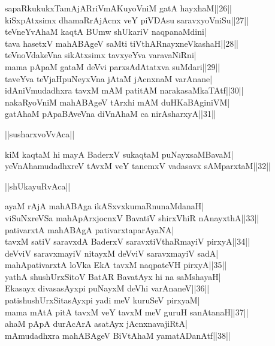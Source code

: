 \documentclass{article}
\begin{document}
sapaRkukukxTamAjARriVmAKuyoVniM gatA hayxhaM||26||\\
kiSxpAtxsimx dhamaRrAjAcnx veY piVDAsu saravxyoVniSu||27||\\
teVneYvAhaM kaqtA BUmw shUkariV naqpanaMdini|\\
tava hasetxV mahABAgeV saMti tiVthARnayxneVkashaH||28||\\
teVnoVdakeVna sikAtxsimx tavxyeYva varavaNiRni|\\
mama pApaM gataM deVvi parxsAdAtatxva suMdari||29||\\
taveYva teVjaHpuNeyxVna jAtaM jAcnxnaM varAnane|\\
idAniVmudadhxra tavxM mAM patitAM narakasaMkaTAtf||30||\\
nakaRyoVniM mahABAgeV tArxhi mAM duHKaBAginiVM|\\
gatAhaM pApaBAveVna diVnAhaM ca nirAsharxyA||31||\\

\begin{center}
||susharxvoVvAca||
\end{center}

kiM kaqtaM hi mayA BaderxV sukaqtaM puNayxsaMBavaM|\\
yeVnAhamudadhxreV tAvxM veY tanemxV vadasavx sAMparxtaM||32||\\

\begin{center}
||shUkayuRvAca||
\end{center}

ayaM rAjA mahABAga ikASxvxkumaRnunaMdanaH|\\
viSuNxreVSa mahApArxjocnxV BavatiV shirxVhiR nAnayxthA||33||\\
pativarxtA mahABAgA pativarxtaparAyaNA|\\
tavxM satiV saravxdA BaderxV saravxtiVthaRmayiV pirxyA||34||\\
deVviV saravxmayiV nitayxM deVviV saravxmayiV sadA|\\
mahApativarxtA loVka EkA tavxM naqpateVH pirxyA||35||\\
yathA shushUrxSitoV BatAR BavatAyx hi na saMshayaH|\\
Ekasayx divasasAyxpi puNayxM deVhi varAnaneV||36||\\
patishushUrxSitasAyxpi yadi meV kuruSeV pirxyaM|\\
mama mAtA pitA tavxM veY tavxM meV guruH sanAtanaH||37||\\
ahaM pApA durAcArA asatAyx jAcnxnavajiRtA|\\
mAmudadhxra mahABAgeV BiVtAhaM yamatADanAtf||38||\\
\end{document}
